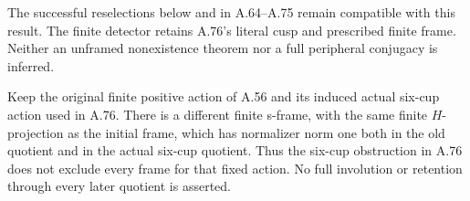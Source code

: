 The successful reselections below and in A.64--A.75 remain
compatible with this result. The finite detector retains A.76's
literal cusp and prescribed finite frame. Neither an unframed
nonexistence theorem nor a full peripheral conjugacy is inferred.


Keep the original finite positive action of A.56 and its induced
actual six-cup action used in A.76. There is a different finite
s-frame, with the same finite \(H\)-projection as the initial frame, which has normalizer
norm one both in the old quotient and in the actual six-cup
quotient. Thus the six-cup obstruction in A.76 does not exclude
every frame for that fixed action. No full involution or retention
through every later quotient is asserted.

